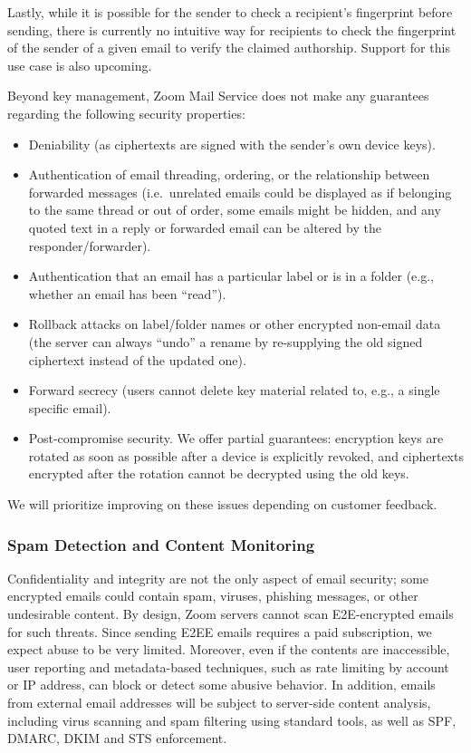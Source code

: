 Lastly, while it is possible for the sender to check a recipient's fingerprint before
sending, there is currently no intuitive way for recipients to check the fingerprint of the sender
of a given email to verify the claimed authorship. Support for this use case is also upcoming.

Beyond key management, Zoom Mail Service does not make any guarantees regarding the following
security properties:
\begin{itemize}
    \item Deniability (as ciphertexts are signed with the sender's own device keys).
    \item Authentication of email threading, ordering, or the relationship between forwarded
        messages (i.e.\ unrelated emails could be displayed as if belonging to the same thread or out
        of order, some emails might be hidden, and any quoted text in a reply or forwarded email can
        be altered by the responder/forwarder).
    \item Authentication that an email has a particular label or is in a folder (e.g., whether an
        email has been ``read'').
    \item Rollback attacks on label/folder names or other encrypted non-email data (the server can
        always ``undo'' a rename by re-supplying the old signed ciphertext instead of the updated
        one).
    \item Forward secrecy (users cannot delete key material related to, e.g., a single specific
        email).
    \item Post-compromise security. We offer partial guarantees: encryption keys are rotated as soon
        as possible after a device is explicitly revoked, and ciphertexts encrypted after the
        rotation cannot be decrypted using the old keys. 
\end{itemize}

We will prioritize improving on these issues depending on customer feedback.

\subsubsection{Spam Detection and Content Monitoring}

Confidentiality and integrity are not the only aspect of email security; some encrypted emails could
contain spam, viruses, phishing messages, or other undesirable content. By design, Zoom servers
cannot scan E2E-encrypted emails for such threats. Since sending E2EE emails requires a paid
subscription, we expect abuse to be very limited. Moreover, even if the contents are inaccessible,
user reporting and metadata-based techniques, such as rate limiting by account or IP address, can
block or detect some abusive behavior. In addition, emails from external email addresses will be
subject to server-side content analysis, including virus scanning and spam filtering using standard
tools, as well as SPF, DMARC, DKIM and STS enforcement.
